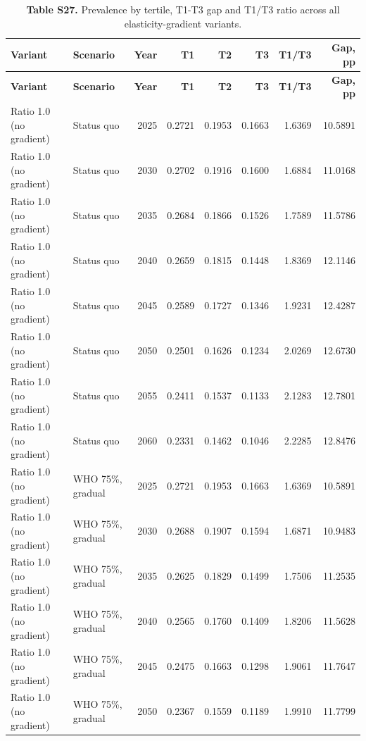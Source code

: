 \scriptsize
\setlength{\tabcolsep}{4pt}
\begin{longtable}{llrrrrrr}
\caption{\textbf{Table S27.} Prevalence by tertile, T1-T3 gap and T1/T3 ratio across all elasticity-gradient variants.}\\
\toprule
\textbf{Variant} & \textbf{Scenario} & \textbf{Year} & \textbf{T1} & \textbf{T2} & \textbf{T3} & \textbf{T1/T3} & \textbf{Gap, pp} \\
\midrule
\endfirsthead
\toprule
\textbf{Variant} & \textbf{Scenario} & \textbf{Year} & \textbf{T1} & \textbf{T2} & \textbf{T3} & \textbf{T1/T3} & \textbf{Gap, pp} \\
\midrule
\endhead
\bottomrule
\endfoot
Ratio 1.0 (no gradient) & Status quo & 2025 & 0.2721 & 0.1953 & 0.1663 & 1.6369 & 10.5891 \\
Ratio 1.0 (no gradient) & Status quo & 2030 & 0.2702 & 0.1916 & 0.1600 & 1.6884 & 11.0168 \\
Ratio 1.0 (no gradient) & Status quo & 2035 & 0.2684 & 0.1866 & 0.1526 & 1.7589 & 11.5786 \\
Ratio 1.0 (no gradient) & Status quo & 2040 & 0.2659 & 0.1815 & 0.1448 & 1.8369 & 12.1146 \\
Ratio 1.0 (no gradient) & Status quo & 2045 & 0.2589 & 0.1727 & 0.1346 & 1.9231 & 12.4287 \\
Ratio 1.0 (no gradient) & Status quo & 2050 & 0.2501 & 0.1626 & 0.1234 & 2.0269 & 12.6730 \\
Ratio 1.0 (no gradient) & Status quo & 2055 & 0.2411 & 0.1537 & 0.1133 & 2.1283 & 12.7801 \\
Ratio 1.0 (no gradient) & Status quo & 2060 & 0.2331 & 0.1462 & 0.1046 & 2.2285 & 12.8476 \\
Ratio 1.0 (no gradient) & WHO 75\%, gradual & 2025 & 0.2721 & 0.1953 & 0.1663 & 1.6369 & 10.5891 \\
Ratio 1.0 (no gradient) & WHO 75\%, gradual & 2030 & 0.2688 & 0.1907 & 0.1594 & 1.6871 & 10.9483 \\
Ratio 1.0 (no gradient) & WHO 75\%, gradual & 2035 & 0.2625 & 0.1829 & 0.1499 & 1.7506 & 11.2535 \\
Ratio 1.0 (no gradient) & WHO 75\%, gradual & 2040 & 0.2565 & 0.1760 & 0.1409 & 1.8206 & 11.5628 \\
Ratio 1.0 (no gradient) & WHO 75\%, gradual & 2045 & 0.2475 & 0.1663 & 0.1298 & 1.9061 & 11.7647 \\
Ratio 1.0 (no gradient) & WHO 75\%, gradual & 2050 & 0.2367 & 0.1559 & 0.1189 & 1.9910 & 11.7799 \\

\end{longtable}
